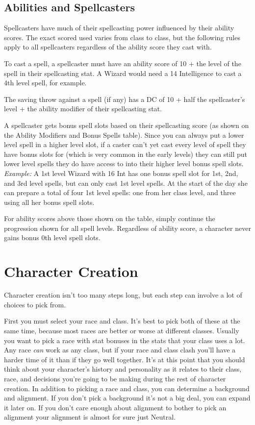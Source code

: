 \subsection{Abilities and Spellcasters}
Spellcasters have much of their spellcasting power influenced by their ability scores. The exact scored used varies from class to class, but the following rules apply to all spellcasters regardless of the ability score they cast with.

To cast a spell, a spellcaster must have an ability score of 10 + the level of the spell in their spellcasting stat. A Wizard would need a 14 Intelligence to cast a 4th level spell, for example.

The saving throw against a spell (if any) has a DC of 10 + half the spellcaster's level + the ability modifier of their spellcasting stat.

A spellcaster gets bonus spell slots based on their spellcasting score (as shown on the Ability Modifiers and Bonus Spells table). Since you can always put a lower level spell in a higher level slot, if a caster can't yet cast every level of spell they have bonus slots for (which is very common in the early levels) they can still put lower level spells they do have access to into their higher level bonus spell slots. \textit{Example:} A 1st level Wizard with 16 Int has one bonus spell slot for 1st, 2nd, and 3rd level spells, but can only cast 1st level spells. At the start of the day she can prepare a total of four 1st level spells: one from her class level, and three using all her bonus spell slots.

For ability scores above those shown on the table, simply continue the progression shown for all spell levels. Regardless of ability score, a character never gains bonus 0th level spell slots.

\section{Character Creation}

Character creation isn't too many steps long, but each step can involve a lot of choices to pick from.

First you must select your race and class. It's best to pick both of these at the same time, because most races are better or worse at different classes. Usually you want to pick a race with stat bonuses in the stats that your class uses a lot. Any race \textit{can} work as any class, but if your race and class clash you'll have a harder time of it than if they go well together. It's at this point that you should think about your character's history and personality as it relates to their class, race, and decisions you're going to be making during the rest of character creation. In addition to picking a race and class, you can determine a background and alignment. If you don't pick a background it's not a big deal, you can expand it later on. If you don't care enough about alignment to bother to pick an alignment your alignment is almost for sure just Neutral.

